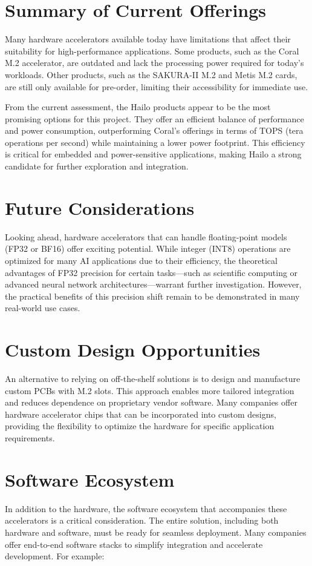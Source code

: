\section{Summary of Current Offerings}
Many hardware accelerators available today have limitations that affect their suitability for high-performance applications.
Some products, such as the Coral M.2 accelerator, are outdated and lack the processing power required for today's workloads.
Other products, such as the SAKURA-II M.2 and Metis M.2 cards, are still only available for pre-order, limiting their accessibility for immediate use.

From the current assessment, the Hailo products appear to be the most promising options for this project.
They offer an efficient balance of performance and power consumption, outperforming Coral's offerings in terms of TOPS (tera operations per second) while maintaining a lower power footprint.
This efficiency is critical for embedded and power-sensitive applications, making Hailo a strong candidate for further exploration and integration.

\section{Future Considerations}
Looking ahead, hardware accelerators that can handle floating-point models (FP32 or BF16) offer exciting potential.
While integer (INT8) operations are optimized for many AI applications due to their efficiency, the theoretical advantages of FP32 precision for certain tasks—such as scientific computing or advanced neural network architectures—warrant further investigation.
However, the practical benefits of this precision shift remain to be demonstrated in many real-world use cases.


\section{Custom Design Opportunities}
An alternative to relying on off-the-shelf solutions is to design and manufacture custom PCBs with M.2 slots.
This approach enables more tailored integration and reduces dependence on proprietary vendor software. 
Many companies offer hardware accelerator chips that can be incorporated into custom designs, providing the flexibility to optimize the hardware for specific application requirements.


\section{Software Ecosystem}
In addition to the hardware, the software ecosystem that accompanies these accelerators is a critical consideration.
The entire solution, including both hardware and software, must be ready for seamless deployment.
Many companies offer end-to-end software stacks to simplify integration and accelerate development. For example:

